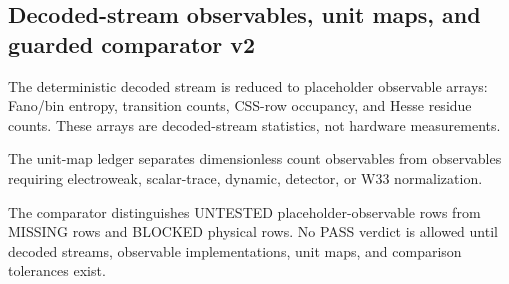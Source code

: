 \subsection{Decoded-stream observables, unit maps, and guarded comparator v2}
\label{sec:bt1624-bt1626-sm-observable-comparator}

The deterministic decoded stream is reduced to placeholder observable arrays: Fano/bin entropy, transition counts, CSS-row occupancy, and Hesse residue counts.  These arrays are decoded-stream statistics, not hardware measurements.

The unit-map ledger separates dimensionless count observables from observables requiring electroweak, scalar-trace, dynamic, detector, or W33 normalization.

The comparator distinguishes UNTESTED placeholder-observable rows from MISSING rows and BLOCKED physical rows.  No PASS verdict is allowed until decoded streams, observable implementations, unit maps, and comparison tolerances exist.
